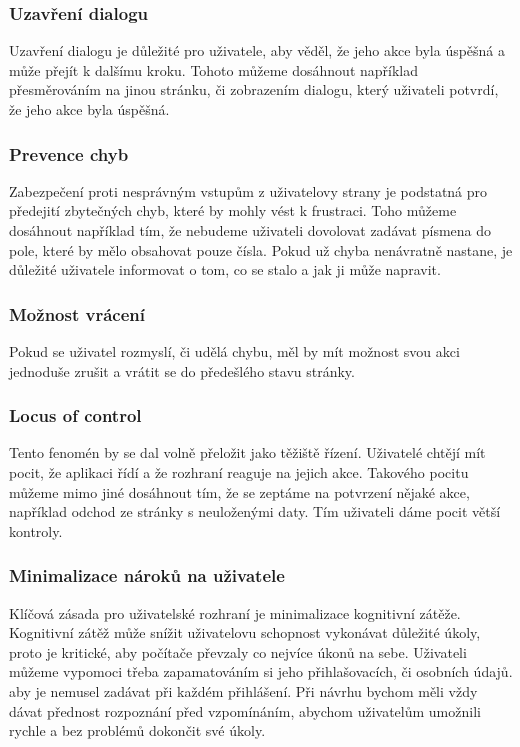 \subsubsection*{Uzavření dialogu}
Uzavření dialogu je důležité pro uživatele, aby věděl, že jeho akce byla úspěšná a může přejít k dalšímu kroku. Tohoto můžeme dosáhnout například přesměrováním na jinou stránku, či zobrazením dialogu, který uživateli potvrdí, že jeho akce byla úspěšná.

\subsubsection*{Prevence chyb}
Zabezpečení proti nesprávným vstupům z uživatelovy strany je podstatná pro předejití zbytečných chyb, které by mohly vést k frustraci. Toho můžeme dosáhnout například tím, že nebudeme uživateli dovolovat zadávat písmena do pole, které by mělo obsahovat pouze čísla. Pokud už chyba nenávratně nastane, je důležité uživatele informovat o tom, co se stalo a jak ji může napravit.

\subsubsection*{Možnost vrácení}
Pokud se uživatel rozmyslí, či udělá chybu, měl by mít možnost svou akci jednoduše zrušit a vrátit se do předešlého stavu stránky.

\subsubsection*{Locus of control}
Tento fenomén by se dal volně přeložit jako těžiště řízení. Uživatelé chtějí mít pocit, že aplikaci řídí a že rozhraní reaguje na jejich akce. Takového pocitu můžeme mimo jiné dosáhnout tím, že se zeptáme na potvrzení nějaké akce, například odchod ze stránky s neuloženými daty. Tím uživateli dáme pocit větší kontroly.

\subsubsection*{Minimalizace nároků na uživatele}
Klíčová zásada pro uživatelské rozhraní je minimalizace kognitivní zátěže. Kognitivní zátěž může snížit uživatelovu schopnost vykonávat důležité úkoly, proto je kritické, aby počítače převzaly co nejvíce úkonů na sebe. Uživateli můžeme vypomoci třeba zapamatováním si jeho přihlašovacích, či osobních údajů. aby je nemusel zadávat při každém přihlášení. Při návrhu bychom měli vždy dávat přednost rozpoznání před vzpomínáním, abychom uživatelům umožnili rychle a bez problémů dokončit své úkoly.

